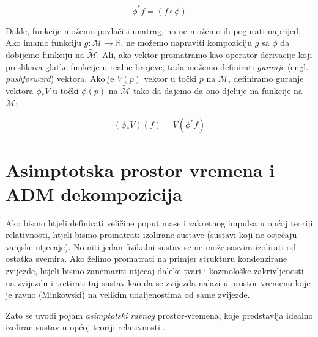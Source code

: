 \begin{equation*}
\phi^*f=(f\circ \phi)
\end{equation*}

\noindent Dakle, funkcije možemo povlačiti unatrag, no ne možemo ih pogurati naprijed. Ako imamo funkciju $g:\mathcal{M}\to \mathbb{R}$, ne možemo napraviti kompoziciju $g$ sa $\phi$ da dobijemo funkciju na $\tilde{\mathcal{M}}$. Ali, ako vektor promatramo kao operator derivacije koji preslikava glatke funkcije u realne brojeve, tada možemo definirati \textit{guranje} (engl. \textit{pushforward}) vektora. Ako je $V(p)$ vektor u točki $p$ na $\mathcal{M}$, definiramo guranje vektora $\phi_* V$ u točki $\phi(p)$ na $\tilde{\mathcal{M}}$ tako da dajemo da ono djeluje na funkcije na $\tilde{\mathcal{M}}$:

\begin{equation*}
(\phi_* V)(f)=V(\phi^* f)
\end{equation*}

\section{Asimptotska prostor vremena i ADM dekompozicija}

Ako bismo htjeli definirati veličine poput mase i zakretnog impulsa u općoj teoriji relativnosti, htjeli bismo promatrati izolirane sustave (sustavi koji ne osjećaju vanjske utjecaje). No niti jedan fizikalni sustav se ne može sasvim izolirati od ostatka svemira. Ako želimo promatrati na primjer strukturu kondenzirane zvijezde, htjeli bismo zanemariti utjecaj daleke tvari i kozmološke zakrivljenosti na zvijezdu i tretirati taj sustav kao da se zvijezda nalazi u prostor-vremenu koje je ravno (Minkowski) na velikim udaljenostima od same zvijezde.

\noindent Zato se uvodi pojam \textit{asimptotski ravnog} prostor-vremena, koje predstavlja idealno izoliran sustav u općoj teoriji relativnosti \citep{wald2010general}.

